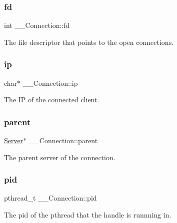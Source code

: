 \subsubsection{\texorpdfstring{fd}{fd}}
{\footnotesize\ttfamily int \+\_\+\+\_\+\+Connection\+::fd}



The file descriptor that points to the open connections. 

\mbox{\label{struct_____connection_a4612124e8b89da32e748c7a5377ad554}} 
\subsubsection{\texorpdfstring{ip}{ip}}
{\footnotesize\ttfamily char$\ast$ \+\_\+\+\_\+\+Connection\+::ip}



The IP of the connected client. 

\mbox{\label{struct_____connection_ad4b092dd27ad2126d0a6ee313e14c430}} 
\subsubsection{\texorpdfstring{parent}{parent}}
{\footnotesize\ttfamily \mbox{\hyperlink{server_8h_a705d964b8a67edeeb3943273a397e4c2}{Server}}$\ast$ \+\_\+\+\_\+\+Connection\+::parent}



The parent server of the connection. 

\mbox{\label{struct_____connection_a14f7aa2d4815a0292b0e0579ea3ffec3}} 
\subsubsection{\texorpdfstring{pid}{pid}}
{\footnotesize\ttfamily pthread\+\_\+t \+\_\+\+\_\+\+Connection\+::pid}



The pid of the pthread that the handle is runnning in. 

